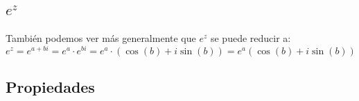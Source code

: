 \documentclass[12pt, fleqn]{report}                             %
\newcommand{\Wrap}[1]{\left( #1 \right)}                        %
\newcommand{\Cos}[1]{\cos\Wrap{#1}}                             %
\newcommand{\Sin}[1]{\sin\Wrap{#1}}                             %
\newcommand \Cis[1]  {\Cos{#1} + i \Sin{#1}}                    %
\newcommand \pCis[1] {\Wrap{\Cis{#1}}}                          %
\begin{document}
            \subsection{$e^z$}

                También podemos ver más generalmente que $e^z$ se puede reducir a:
                \begin{equation*}
                    e^z = e^{a+bi} = e^a \cdot e^{bi} = e^a \cdot \pCis{b} = e^a \pCis{b}
                \end{equation*}

        
            \clearpage
            \subsection{Propiedades}
\end{document}
